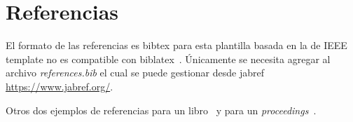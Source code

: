 \documentclass[conference]{IEEEtran}
\begin{document}
\section{Referencias}
El formato de las referencias es bibtex para esta plantilla basada en la de IEEE template no es compatible con biblatex~\cite{Donald1986,Mittelbach2004}. Únicamente se necesita agregar al archivo \textit{references.bib} el cual se puede gestionar desde jabref \url{https://www.jabref.org/}.

Otros dos ejemplos de referencias para un libro~\cite{Stallings2009} y para un \textit{proceedings}~\cite{Pina-Ramirez2006}.


%


\end{document}
